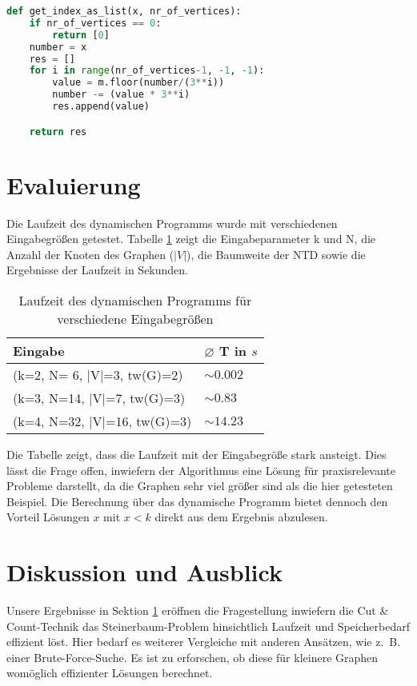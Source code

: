 \begin{svgraybox}
\begin{lstlisting}[language=python,label={code:as_list}, basicstyle=\small, caption=Funktion get\_index\_as\_list zur Berechnung der ternären Färbung aus dem Index]
def get_index_as_list(x, nr_of_vertices):
    if nr_of_vertices == 0:
        return [0]
    number = x
    res = []
    for i in range(nr_of_vertices-1, -1, -1):
        value = m.floor(number/(3**i))
        number -= (value * 3**i)
        res.append(value)

    return res
\end{lstlisting}
\end{svgraybox}

\section{Evaluierung}
\label{sec:impl_eval}
Die Laufzeit des dynamischen Programms wurde mit verschiedenen Eingabegrößen getestet. Tabelle \ref{t:eval} zeigt die Eingabeparameter k und N, die Anzahl der Knoten des Graphen ($|V|$), die Baumweite der NTD sowie die Ergebnisse der Laufzeit in Sekunden.
\begin{table}
\centering
\begin{tabular}{l | l} 
\textbf{Eingabe} & \textbf{ $\varnothing$ T in $s$}\\
\hline
(k=2, N= 6, |V|=3, tw(G)=2) & $ \sim 0.002$ \\
(k=3, N=14, |V|=7, tw(G)=3) & $ \sim 0.83$ \\
(k=4, N=32, |V|=16, tw(G)=3) & $ \sim 14.23$ \\
\end{tabular}
\caption{Laufzeit des dynamischen Programms für verschiedene Eingabegrößen}
\label{t:eval}
\end{table}

Die Tabelle zeigt, dass die Laufzeit mit der Eingabegröße stark ansteigt. Dies lässt die Frage offen, inwiefern der Algorithmus eine Lösung für praxisrelevante Probleme darstellt, da die Graphen sehr viel größer sind als die hier getesteten Beispiel. 
Die Berechnung über das dynamische Programm bietet dennoch den Vorteil Lösungen $x$ mit $x<k$ direkt aus dem Ergebnis abzulesen.

\section{Diskussion und Ausblick}
\label{sec:impl_outlook}
Unsere Ergebnisse in Sektion \ref{sec:impl_eval} eröffnen die Fragestellung inwiefern die Cut \& Count-Technik das Steinerbaum-Problem hinsichtlich Laufzeit und Speicherbedarf effizient löst. 
Hier bedarf es weiterer Vergleiche mit anderen Ansätzen, wie z.~B. einer Brute-Force-Suche. Es ist zu erforschen, ob diese für kleinere Graphen womöglich effizienter Lösungen berechnet.

